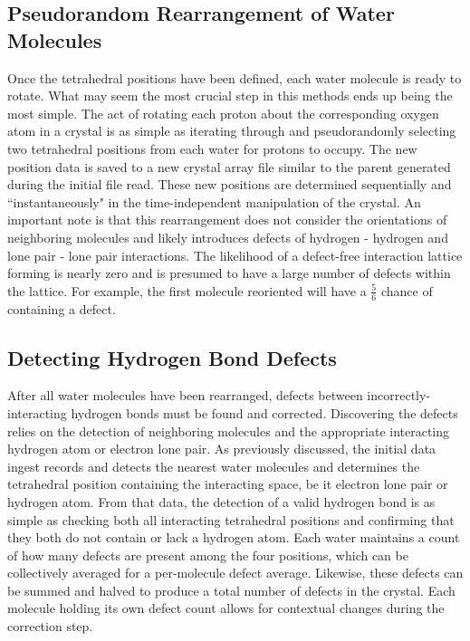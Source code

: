 \subsection{Pseudorandom Rearrangement of Water Molecules}

Once the tetrahedral positions have been defined, each water molecule is ready to rotate.
What may seem the most crucial step in this methods ends up being the most simple.
The act of rotating each proton about the corresponding oxygen atom in a crystal is as simple as iterating through and pseudorandomly selecting two tetrahedral positions from each water for protons to occupy.
The new position data is saved to a new crystal array file similar to the parent generated during the initial file read.
These new positions are determined sequentially and ``instantaneously" in the time-independent manipulation of the crystal.
An important note is that this rearrangement does not consider the orientations of neighboring molecules and likely introduces defects of hydrogen - hydrogen and lone pair - lone pair interactions.
The likelihood of a defect-free interaction lattice forming is nearly zero and is presumed to have a large number of defects within the lattice. 
For example, the first molecule reoriented will have a $\frac{5}{6}$ chance of containing a defect.


\subsection{Detecting Hydrogen Bond Defects}

After all water molecules have been rearranged, defects between incorrectly-interacting hydrogen bonds must be found and corrected.
Discovering the defects relies on the detection of neighboring molecules and the appropriate interacting hydrogen atom or electron lone pair. 
As previously discussed, the initial data ingest records and detects the nearest water molecules and determines the tetrahedral position containing the interacting space, be it electron lone pair or hydrogen atom. 
From that data, the detection of a valid hydrogen bond is as simple as checking both all interacting tetrahedral positions and confirming that they both do not contain or lack a hydrogen atom.
Each water maintains a count of how many defects are present among the four positions, which can be collectively averaged for a per-molecule defect average.
Likewise, these defects can be summed and halved to produce a total number of defects in the crystal. 
Each molecule holding its own defect count allows for contextual changes during the correction step.


